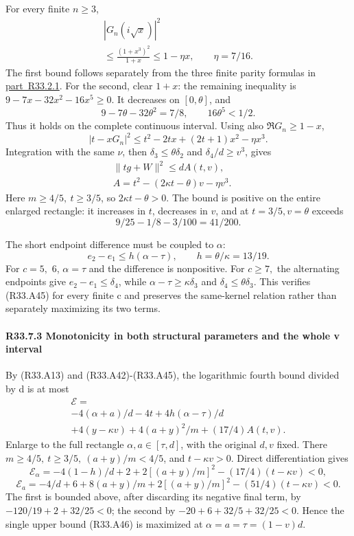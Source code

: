 For every finite \(n\ge3\),
\[
\begin{gathered}
|G_n(i\sqrt x)|^2\\
\le\frac{(1+x^3)^2}{1+x}\le1-\eta x,\qquad\eta=7/16.
\end{gathered}\tag{R33.A43}
\]
The first bound follows separately from the three finite parity
formulas in \mbox{\hyperref[part:R33.2.1]{part R33.2.1}}.
For the second, clear \(1+x\): the remaining inequality is
\(9-7x-32x^2-16x^5\ge0\).
It decreases on \([0,\allowbreak \allowbreak  \theta]\), and
\[
9-7\theta-32\theta^2=7/8,\qquad16\theta^5<1/2.
\]
Thus it holds on the complete continuous interval.
Using also \(\Re G_n\ge1-x\),
\[
|t-xG_n|^2\le t^2-2tx+(2t+1)x^2-\eta x^3.
\]
Integration with the same \(\nu\), then \(\delta_3\le\theta \delta_2\) and
\(\delta_4/d\ge v^3\), gives
\[
\begin{gathered}
\|tg+W\|^2\le dA(t,v),\qquad\\
A=t^2-(2\kappa t-\theta)v-\eta v^3.
\end{gathered}\tag{R33.A44}
\]
Here \(m\ge4/5,\allowbreak \allowbreak  \ t\ge3/5\), so \(2\kappa t-\theta>0\).
The bound is positive on the entire enlarged rectangle:
it increases in \(t\), decreases in \(v\), and at
\(t=3/5,\allowbreak \allowbreak  v=\theta\) exceeds
\[
9/25-1/8-3/100=41/200.
\]

The short endpoint difference must be coupled to \(\alpha\):
\[
e_2-e_1\le h(\alpha-\tau),\qquad h=\theta/\kappa=13/19. \tag{R33.A45}
\]
For \(c=5,\allowbreak \) 6, \(\alpha=\tau\) and the difference is nonpositive.
For \(c\ge 7,\allowbreak \) the alternating endpoints give \(e_2-e_1\le \delta_4\),
while \(\alpha-\tau\ge\kappa \delta_3\) and \(\delta_4\le\theta \delta_3\).
This verifies (R33.A45) for every finite c and preserves the same-kernel
relation rather than separately maximizing its two terms.

\paragraph{R33.7.3 Monotonicity in both structural parameters and the whole v interval}

By (R33.A13) and (R33.A42)-(R33.A45), the logarithmic fourth bound divided by d
is at most
\[
\begin{gathered}
\mathcal E=\\
-4(\alpha+a)/d-4t+4h(\alpha-\tau)/d\\
+4(y-\kappa v)+4(a+y)^2/m+(17/4)A(t,v).
\end{gathered}\tag{R33.A46}
\]
Enlarge to the full rectangle \(\alpha,\allowbreak \allowbreak  a\in[\tau,\allowbreak \allowbreak  d]\), with the
original \(d,\allowbreak \allowbreak  v\) fixed.
There \(m\ge4/5,\allowbreak \allowbreak  \ t\ge3/5,\allowbreak \allowbreak  \ (a+y)/m<4/5\), and \(t-\kappa v>0\).
Direct differentiation gives
\[
\mathcal E_\alpha
=-4(1-h)/d+2+2[(a+y)/m]^2-(17/4)(t-\kappa v)<0,
\]
\[
\mathcal E_a
=-4/d+6+8(a+y)/m+2[(a+y)/m]^2-(51/4)(t-\kappa v)<0.
\]
The first is bounded above, after discarding its negative final term, by
\(-120/19+2+32/25<0\); the second by
\(-20+6+32/5+32/25<0\).
Hence the single upper bound (R33.A46) is maximized at
\(\alpha=a=\tau=(1-v)d\).


